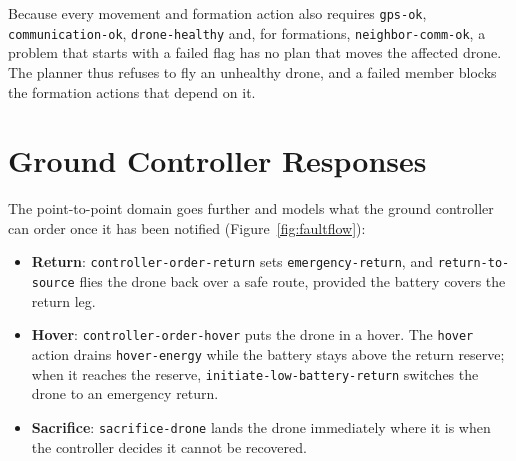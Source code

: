 \documentclass[11pt,a4paper,oneside]{report}
\newcommand{\code}[1]{\texttt{#1}}
\begin{document}
\noindent Because every movement and formation action also requires \code{gps-ok},
\code{communication-ok}, \code{drone-healthy} and, for formations, \code{neighbor-comm-ok}, a
problem that starts with a failed flag has no plan that moves the affected drone. The planner
thus refuses to fly an unhealthy drone, and a failed member blocks the formation actions that
depend on it.

\section{Ground Controller Responses}
The point-to-point domain goes further and models what the ground controller can order once it
has been notified (Figure~\ref{fig:faultflow}):
\begin{itemize}
  \item \textbf{Return}: \code{controller-order-return} sets \code{emergency-return}, and
        \code{return-to-source} flies the drone back over a safe route, provided the battery
        covers the return leg.
  \item \textbf{Hover}: \code{controller-order-hover} puts the drone in a hover. The \code{hover}
        action drains \code{hover-energy} while the battery stays above the return reserve; when
        it reaches the reserve, \code{initiate-low-battery-return} switches the drone to an
        emergency return.
  \item \textbf{Sacrifice}: \code{sacrifice-drone} lands the drone immediately where it is when the
        controller decides it cannot be recovered.
\end{itemize}
\end{document}
